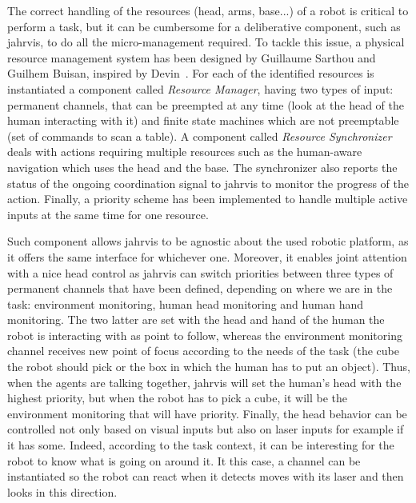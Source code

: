\documentclass[a4paper,11pt,twoside]{StyleThese}
\begin{document}
The correct handling of the resources (head, arms, base...) of a robot is critical to perform a task, but it can be cumbersome for a deliberative component, such as \acrshort{jahrvis}, to do all the micro-management required. To tackle this issue, a physical resource management system has been designed by Guillaume Sarthou and Guilhem Buisan, inspired by Devin~\cite{devin_2017_decisional}. For each of the identified resources is instantiated a component called \emph{Resource Manager}, having two types of input: permanent channels, that can be preempted at any time (\eg look at the head of the human interacting with it) and finite state machines which are not preemptable (\eg set of commands to scan a table). A component called \emph{Resource Synchronizer} deals with actions requiring multiple resources such as the human-aware navigation which uses the head and the base. The synchronizer also reports the status of the ongoing coordination signal to \acrshort{jahrvis} to monitor the progress of the action. Finally, a priority scheme has been implemented to handle multiple active inputs at the same time for one resource. 

Such component allows \acrshort{jahrvis} to be agnostic about the used robotic platform, as it offers the same interface for whichever one. Moreover, it enables joint attention with a nice head control as \acrshort{jahrvis} can switch priorities between three types of permanent channels that have been defined, depending on where we are in the task: environment monitoring, human head monitoring and human hand monitoring. The two latter are set with the head and hand of the human the robot is interacting with as point to follow, whereas the environment monitoring channel receives new point of focus according to the needs of the task (\eg the cube the robot should pick or the box in which the human has to put an object). Thus, when the agents are talking together, \acrshort{jahrvis} will set the human's head with the highest priority, but when the robot has to pick a cube, it will be the environment monitoring that will have priority. Finally, the head behavior can be controlled not only based on visual inputs but also on laser inputs for example if it has some. Indeed, according to the task context, it can be interesting for the robot to know what is going on around it. It this case, a channel can be instantiated so the robot can react when it detects moves with its laser and then looks in this direction.
\end{document}
